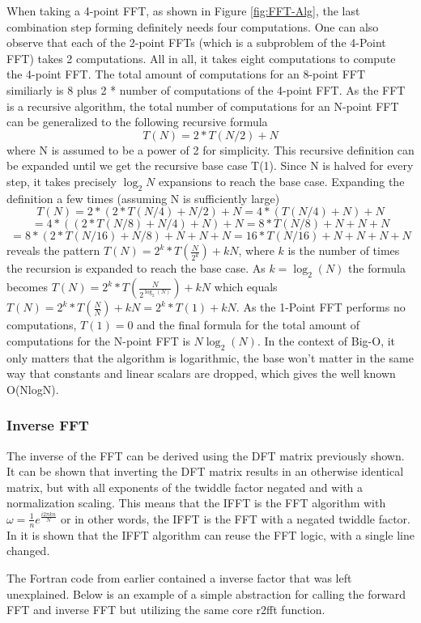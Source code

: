 When taking a 4-point FFT, as shown in Figure \ref{fig:FFT-Alg}, the last combination step forming definitely needs four computations. One can also observe that each of the 2-point FFTs (which is a subproblem of the 4-Point FFT) takes 2 computations. All in all, it takes eight computations to compute the 4-point FFT. The total amount of computations for an 8-point FFT similiarly is 8 plus 2 * number of computations of the 4-point FFT. As the FFT is a recursive algorithm, the total number of computations for an N-point FFT can be generalized to the following recursive formula
$$T(N) = 2*T(N/2) + N$$
where N is assumed to be a power of 2 for simplicity. This recursive definition can be expanded
until we get the recursive base case T(1). Since N is halved for every step, it takes precisely $\log_2 N$ expansions to reach the base case. Expanding the definition a few times (assuming N is sufficiently large)
$$T(N) = 2*(2*T(N/4) + N/2) + N = 4*(T(N/4) + N) + N$$
$$= 4*((2*T(N/8)+N/4) + N) + N = 8*T(N/8) + N + N + N$$
$$= 8*(2*T(N/16) + N/8) + N + N + N = 16*T(N/16) + N + N + N + N$$
reveals the pattern $T(N) = 2^k*T(\frac{N}{2^k}) + kN$, where $k$ is the number of times the recursion is expanded to reach the base case. As $k =\log_2(N)$ the formula becomes $T(N) = 2^k*T(\frac{N}{2^{\log_2(N)}}) + kN$ which equals $T(N) = 2^k*T(\frac{N}{N}) + kN = 2^k * T(1) + kN$. As the 1-Point FFT performs no computations, $T(1) = 0$ and the final formula for the total amount of computations for the N-point FFT is $N \log_2(N)$. In the context of Big-O, it only matters that the algorithm is logarithmic, the base won't matter in the same way that constants and linear scalars are dropped, which gives the well known O(NlogN).

\subsubsection{Inverse FFT}
The inverse of the FFT can be derived using the DFT matrix previously shown. It can be shown that inverting the DFT matrix results in an otherwise identical matrix, but with all exponents of the twiddle factor negated and with a normalization scaling. This means that the IFFT is the FFT algorithm with $\omega = \frac{1}{n}e^{\frac{i2\pi kn}{N}}$ or in other words, the IFFT is the FFT with a negated twiddle factor. In \cite{Reducible2020} it is shown that the IFFT algorithm can reuse the FFT logic, with a single line changed. 

The Fortran code from earlier contained a inverse factor that was left unexplained. Below is an example of a simple abstraction for calling the forward FFT and inverse FFT but utilizing the same core r2fft function.


